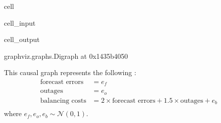 \documentclass[letterpaper,10pt,english]{jupyterBook}
\begin{document}
\begin{sphinxuseclass}{cell}\begin{sphinxVerbatimInput}

\begin{sphinxuseclass}{cell_input}
\begin{sphinxVerbatim}[commandchars=\\\{\}]
  \PYG{p}{[}\PYG{p}{[}  \PYG{p}{]}
              \PYG{p}{[}  \PYG{p}{]}
              \PYG{p}{[}  \PYG{p}{]}\PYG{p}{]}

 \PYG{p}{[}  \PYG{p}{]}
\end{sphinxVerbatim}

\end{sphinxuseclass}\end{sphinxVerbatimInput}
\begin{sphinxVerbatimOutput}

\begin{sphinxuseclass}{cell_output}
\begin{sphinxVerbatim}[commandchars=\\\{\}]
\PYGZlt{}graphviz.graphs.Digraph at 0x1435b4050\PYGZgt{}
\end{sphinxVerbatim}

\end{sphinxuseclass}\end{sphinxVerbatimOutput}

\end{sphinxuseclass}
\sphinxAtStartPar
This causal graph represents the following :
\label{equation:notebooks/basic_dag_structures:9f66005e-6a78-4364-9f04-acc404c8f825}\begin{align}
\text{forecast errors} &= e_f \\
\text{outages} &= e_o \\
\text{balancing costs} &= 2 \times \text{forecast errors} + 1.5 \times \text{outages} + e_b \\
\end{align}
\sphinxAtStartPar
where \(e_f, e_o, e_b \sim \mathcal{N}(0,1)\).
\end{document}

